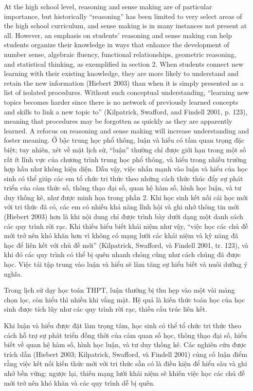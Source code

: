 \documentclass[
  10pt,
  a4paper,
  landscape,
  twoside,
  openany
]{scrbook}
\newcommand{\EN}[1]{#1}
\newcommand{\VI}[1]{#1}
\newcommand{\NOTE}[1]{#1}
\begin{document}
\TriPara
{
\EN{At the high school level, reasoning and sense making are of particular importance, but historically ``reasoning'' has been limited to very select areas of the high school curriculum, and sense making is in many instances not present at all. However, an emphasis on students' reasoning and sense making can help students organize their knowledge in ways that enhance the development of number sense, algebraic fluency, functional relationships, geometric reasoning, and statistical thinking, as exemplified in section 2. When students connect new learning with their existing knowledge, they are more likely to understand and retain the new information (Hiebert 2003) than when it is simply presented as a list of isolated procedures. Without such conceptual understanding, “learning new topics becomes harder since there is no network of previously learned concepts and skills to link a new topic to” (Kilpatrick, Swafford, and Findell 2001, p. 123), meaning that procedures may be forgotten as quickly as they are apparently learned. A refocus on reasoning and sense making will increase understanding and foster meaning.}
}
{
\VI{Ở bậc trung học phổ thông, luận và hiểu có tầm quan trọng đặc biệt; tuy nhiên, xét về mặt lịch sử, ``luận'' thường chỉ được giới hạn trong một số rất ít lĩnh vực của chương trình trung học phổ thông, và hiểu trong nhiều trường hợp hầu như không hiện diện. Dẫu vậy, việc nhấn mạnh vào luận và hiểu của học sinh có thể giúp các em tổ chức tri thức theo những cách thức thúc đẩy sự phát triển của cảm thức số, thông thạo đại số, quan hệ hàm số, hình học luận, và tư duy thống kê, như được minh họa trong phần 2. Khi học sinh kết nối cái học mới với tri thức đã có, các em có nhiều khả năng lĩnh hội và ghi nhớ thông tin mới (Hiebert 2003) hơn là khi nội dung chỉ được trình bày dưới dạng một danh sách các quy trình rời rạc. Khi thiếu hiểu biết khái niệm như vậy, ``việc học các chủ đề mới trở nên khó khăn hơn vì không có mạng lưới các khái niệm và kỹ năng đã học để liên kết với chủ đề mới'' (Kilpatrick, Swafford, và Findell 2001, tr. 123), và khi đó các quy trình có thể bị quên nhanh chóng cũng như cách chúng đã được học. Việc tái tập trung vào luận và hiểu sẽ làm tăng sự hiểu biết và nuôi dưỡng ý nghĩa.}
}
{
\NOTE{Trong lịch sử dạy học toán THPT, luận thường bị thu hẹp vào một vài mảng chọn lọc, còn hiểu thì nhiều khi vắng mặt. Hệ quả là kiến thức toán học của học sinh được tích lũy như các quy trình rời rạc, thiếu cấu trúc liên kết.

Khi luận và hiểu được đặt làm trọng tâm, học sinh có thể tổ chức tri thức theo cách hỗ trợ sự phát triển đồng thời của cảm quan số học, thông thạo đại số, hiểu biết về quan hệ hàm số, hình học luận, và tư duy thống kê. Các nghiên cứu được trích dẫn (Hiebert 2003; Kilpatrick, Swafford, và Findell 2001) củng cố luận điểm rằng việc kết nối kiến thức mới với tri thức sẵn có là điều kiện để hiểu sâu và ghi nhớ bền vững; ngược lại, thiếu mạng lưới khái niệm sẽ khiến việc học các chủ đề mới trở nên khó khăn và các quy trình dễ bị quên.}
}
\end{document}
